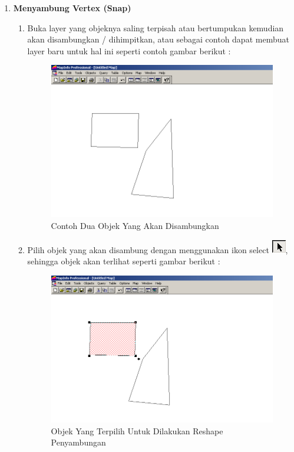 \begin{enumerate}[\bfseries A.]
  \item \textbf{Menyambung Vertex (Snap)}
  
  \begin{enumerate}[1.]
    \item Buka layer yang objeknya saling terpisah atau bertumpukan kemudian akan disambungkan / dihimpitkan, atau sebagai contoh dapat membuat layer baru untuk hal ini seperti contoh gambar berikut :
    
    \begin{figure}[H]
      \centering
      \includegraphics[width=1\textwidth]{./resources/040-layer-sambung-vertex}
      \caption{Contoh Dua Objek Yang Akan Disambungkan}
    \end{figure}
    
    \item Pilih objek yang akan disambung dengan menggunakan ikon select \includegraphics{./resources/008-ikon-select}, sehingga objek akan terlihat seperti gambar berikut :
    
    \begin{figure}[H]
      \centering
      \includegraphics[width=1\textwidth]{./resources/041-objek-reshape-terpilih}
      \caption{Objek Yang Terpilih Untuk Dilakukan Reshape Penyambungan}
    \end{figure}
    

\end{enumerate}
\end{enumerate}
